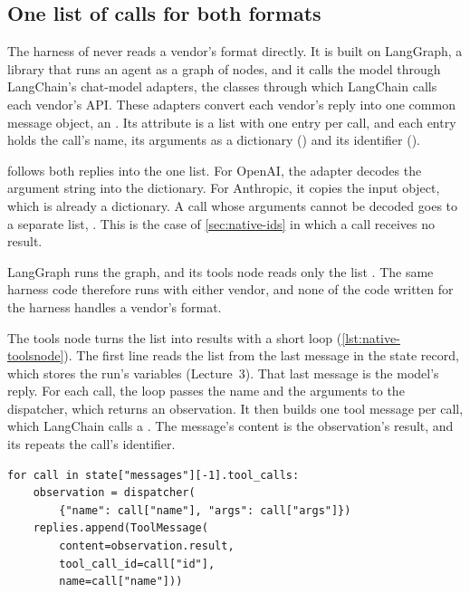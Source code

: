 \subsection{One list of calls for both formats}
\label{sec:native-adapters}

The harness of \msa{} never reads a vendor's format directly. It is built on LangGraph, a library
that runs an agent as a graph of nodes, and it calls the model through LangChain's chat-model
adapters, the classes through which LangChain calls each vendor's API. These adapters convert each
vendor's reply into one common message object, an
 \citep{langchain-messages}. Its attribute  is a list with
one entry per call, and each entry holds the call's name, its arguments as a dictionary
() and its identifier ().

 follows both replies into the one list. For OpenAI, the adapter
decodes the argument string into the dictionary. For Anthropic, it copies the input object, which is
already a dictionary. A call whose arguments cannot be decoded goes to a separate list,
. This is the case of \cref{sec:native-ids} in which a call receives
no result.

LangGraph runs the graph, and its tools node reads only the list . The same
harness code therefore runs with either vendor, and none of the code written for the harness handles
a vendor's format.

The tools node turns the list into results with a short loop (\cref{lst:native-toolsnode}). The
first line reads the list from the last message in the state record, which stores the run's
variables (Lecture~3). That last message is the model's reply. For each call, the loop passes the
name and the arguments to the dispatcher, which returns an observation. It then builds one tool
message per call, which LangChain calls a . The message's content is the
observation's result, and its  repeats the call's identifier.

\begin{lstlisting}[basicstyle=\ttfamily\footnotesize, caption={Illustrative code for the loop of the tools node, abbreviated. Each call goes to the dispatcher, and each observation returns to the model as one tool message keyed by the call's identifier.}, label=lst:native-toolsnode]
for call in state["messages"][-1].tool_calls:
    observation = dispatcher(
        {"name": call["name"], "args": call["args"]})
    replies.append(ToolMessage(
        content=observation.result,
        tool_call_id=call["id"],
        name=call["name"]))
\end{lstlisting}

